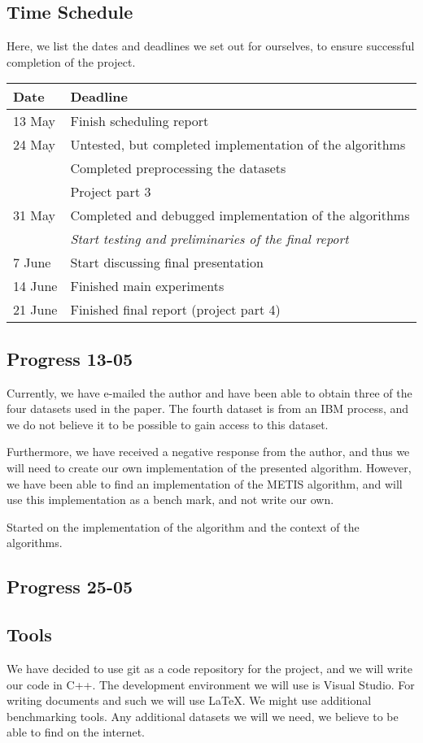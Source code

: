 \documentclass[a4paper,11pt]{article}
\begin{document}
\subsection{Time Schedule}
Here, we list the dates and deadlines we set out for ourselves, to ensure successful completion of the project.

\begin{tabular}{|l|l|}
\hline
\textbf{Date}	&	\textbf{Deadline}\\
\hline
13 May	&	Finish scheduling report\\
\hline
24 May	&	Untested, but completed implementation of the algorithms\\
		&	Completed preprocessing the datasets\\
		&	Project part 3 \\
\hline
31 May	&	Completed and debugged implementation of the algorithms\\
		& 	\textit{Start testing and preliminaries of the final report}\\
\hline
7 June	&	Start discussing final presentation\\
\hline
14 June	&	Finished main experiments\\
\hline
21 June	&	Finished final report (project part 4)\\
\hline
\end{tabular}

\subsection{Progress 13-05}
Currently, we have e-mailed the author and have been able to obtain three of the four datasets used in the paper. The fourth dataset is from an IBM process, and we do not believe it to be possible to gain access to this dataset. 

Furthermore, we have received a negative response from the author, and thus we will need to create our own implementation of the presented algorithm. However, we have been able to find an implementation of the METIS algorithm, and will use this implementation as a bench mark, and not write our own. 

Started on the implementation of the algorithm and the context of the algorithms.

\subsection{Progress 25-05}


\subsection{Tools} 
We have decided to use git as a code repository for the project, and we will write our code in C++. The development environment we will use is Visual Studio. For writing documents and such we will use \LaTeX. We might use additional benchmarking tools. Any additional datasets we will we need, we believe to be able to find on the internet. 
\end{document}
